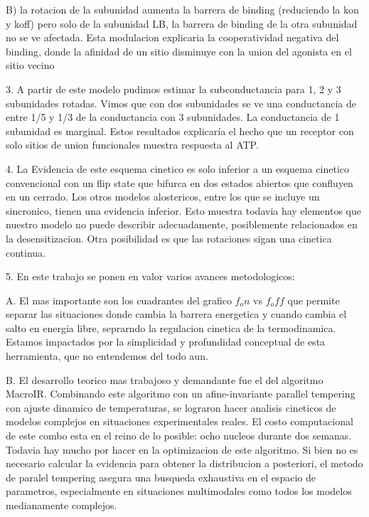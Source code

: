 \documentclass[a4paper,12pt]{article}
\begin{document}
		
		B) la rotacion de la subunidad aumenta la barrera de binding (reduciendo la kon y koff) pero solo de la subunidad LB, la barrera de binding de la otra subunidad no se ve afectada. Esta modulacion explicaria la cooperatividad negativa del binding, donde la afinidad de un sitio disminuye con la union del agonista en el sitio vecino
		
		
		3. A partir de este modelo pudimos estimar la subconductancia para 1, 2 y 3 subunidades rotadas. Vimos que con dos subunidades se ve una conductancia de entre 1/5 y 1/3 de la conductancia con 3 subunidades. La conductancia de 1 subunidad es marginal. Estos resultados explicaría el hecho que un receptor con solo sitios de union funcionales muestra respuesta al ATP. 
		
		
		4. La Evidencia de este esquema cinetico es solo inferior a un esquema cinetico convencional con un flip state que bifurca en  dos estados abiertos que confluyen en un cerrado. Los otros modelos alostericos, entre los que se incluye un sincronico, tienen una evidencia inferior. 
		Esto muestra todavia hay elementos que nuestro modelo no puede describir adecuadamente, posiblemente relacionados en la desensitizacion. Otra posibilidad es que las rotaciones sigan una cinetica continua. 
		
		5. En este trabajo se ponen en valor varios avances metodologicos: 
		
		A. El mas importante son los cuadrantes del grafico $f_on$ vs $f_off$ que permite separar las situaciones donde cambia la barrera energetica y cuando cambia el salto en energia libre, seprarndo la regulacion cinetica de la termodinamica. Estamos impactados por la simplicidad y profundidad conceptual de esta herramienta, que no entendemos del todo aun. 
		
		B. El desarrollo teorico mas trabajoso y demandante fue el del algoritmo MacroIR. Combinando este algoritmo con un afine-invariante parallel tempering con ajuste dinamico de temperaturas, se lograron hacer analisis cineticos de modelos complejos en situaciones experimentales reales. El costo computacional de este combo esta en el reino de lo posible: ocho nucleos durante dos semanas. Todavia hay mucho por hacer en la optimizacion de este algoritmo. 
		Si bien no es necesario calcular la evidencia para obtener la distribucion a posteriori, el metodo de paralel tempering asegura una busqueda exhaustiva en el espacio de parametros, especialmente en situaciones multimodales como todos los modelos medianamente complejos. 
		
\end{document}
